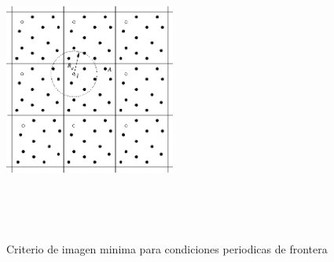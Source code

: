 \documentclass[a4paper,10pt]{report}
\begin{document}
\begin{figure}[!ht]
\centering
\includegraphics[keepaspectratio, height=10cm ,width=0.5\textwidth]{img/minimage.png}
\caption{Criterio de imagen minima para condiciones periodicas de frontera}
\label{minimage}
\end{figure}











%  
\end{document}
